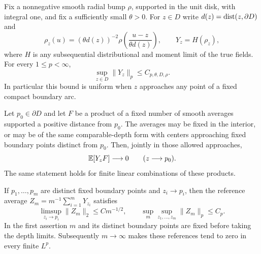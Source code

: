 \begin{proposition}
\label{prop:boundary-moments}
Fix a nonnegative smooth radial bump $\rho$, supported in the unit
disk, with integral one, and fix a sufficiently small $\theta>0$.
For $z\in D$ write $d(z)=\operatorname{dist}(z,\partial D)$ and
\[
 \rho_z(u)=(\theta d(z))^{-2}
       \rho\!\left(\frac{u-z}{\theta d(z)}\right),\qquad
 Y_z=H(\rho_z),
\]
where $H$ is any subsequential distributional and moment limit of
the true fields.  For every $1\le p<\infty$,
\begin{equation}
 \sup_{z\in D}\|Y_z\|_p\le C_{p,\theta,D,\rho}.
 \label{boundary:uniform-depth-moments}
\end{equation}
In particular this bound is uniform when $z$ approaches any point
of a fixed compact boundary arc.

Let $p_0\in\partial D$ and let $F$ be a product of a fixed number
of smooth averages supported a positive distance from $p_0$.
The averages may be fixed in the interior, or may be of the same
comparable-depth form with centers approaching fixed boundary
points distinct from $p_0$.  Then, jointly in those allowed
approaches,
\begin{equation}
 \mathbb E[Y_zF]\longrightarrow0\qquad(z\longrightarrow p_0).
 \label{boundary:spectator-vanishing}
\end{equation}
The same statement holds for finite linear combinations of these
products.

If $p_1,\ldots,p_m$ are distinct fixed boundary points and
$z_i\to p_i$, then the reference average
$Z_m=m^{-1}\sum_{i=1}^mY_{z_i}$ satisfies
\begin{equation}
 \limsup_{z_i\to p_i}\|Z_m\|_2\le C m^{-1/2},
 \qquad \sup_m\sup_{z_1,\ldots,z_m}\|Z_m\|_p\le C_p.
 \label{boundary:reference-average}
\end{equation}
In the first assertion $m$ and its distinct boundary points are
fixed before taking the depth limits.  Subsequently $m\to\infty$
makes these references tend to zero in every finite $L^p$.
\end{proposition}

